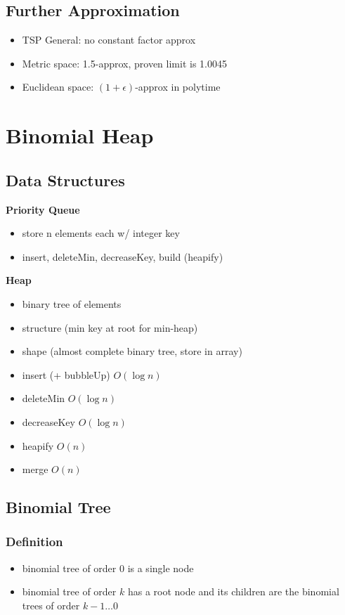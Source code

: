 \documentclass[]{article}
\theoremstyle{definition}
\begin{document}
	\subsection{Further Approximation}
	\begin{itemize}
		\item TSP General: no constant factor approx
		\item Metric space: 1.5-approx, proven limit is 1.0045
		\item Euclidean space: $(1+\epsilon)$-approx in polytime
	\end{itemize}

	\section{Binomial Heap}
	\subsection{Data Structures}
	\textbf{Priority Queue}
	\begin{itemize}
		\item store n elements each w/ integer key
		\item insert, deleteMin, decreaseKey, build (heapify)
	\end{itemize}

	\textbf{Heap}
	\begin{itemize}
		\item binary tree of elements
		\item structure (min key at root for min-heap)
		\item shape (almost complete binary tree, store in array)
		\item insert (+ bubbleUp) $O(\log n)$
		\item deleteMin $O(\log n)$
		\item decreaseKey $O(\log n)$
		\item heapify $O(n)$
		\item merge $O(n)$
	\end{itemize}

	\subsection{Binomial Tree}
	\subsubsection{Definition}
	\begin{itemize}
		\item binomial tree of order 0 is a single node
		\item binomial tree of order $k$ has a root node and its children are the binomial trees of order $k-1\dots0$
	\end{itemize}
\end{document}
